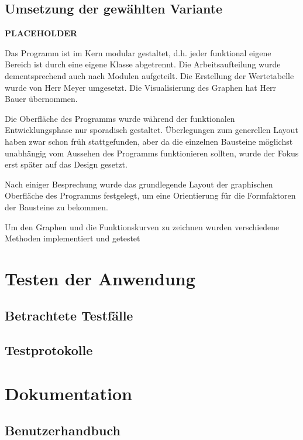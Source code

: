 \documentclass{article}
\begin{document}
\subsection{Umsetzung der gewählten Variante}

    \textbf{PLACEHOLDER}%

    Das Programm ist im Kern modular gestaltet, d.h. jeder funktional eigene Bereich ist durch eine eigene Klasse abgetrennt.
    Die Arbeitsaufteilung wurde dementsprechend auch nach Modulen aufgeteilt.
    Die Erstellung der Wertetabelle wurde von Herr Meyer umgesetzt.
    Die Visualisierung des Graphen hat Herr Bauer übernommen.

    Die Oberfläche des Programms wurde während der funktionalen Entwicklungsphase nur sporadisch gestaltet.
    Überlegungen zum generellen Layout haben zwar schon früh stattgefunden, aber da die einzelnen Bausteine möglichst unabhängig vom Aussehen des Programms funktionieren sollten, wurde der Fokus erst später auf das Design gesetzt.

    Nach einiger Besprechung wurde das grundlegende Layout der graphischen Oberfläche des Programms festgelegt, um eine Orientierung für die Formfaktoren der Bausteine zu bekommen.

    Um den Graphen und die Funktionskurven zu zeichnen wurden verschiedene Methoden implementiert und getestet

\newpage
\section{Testen der Anwendung}

\subsection{Betrachtete Testfälle}


\subsection{Testprotokolle}


\newpage
\section{Dokumentation}

\subsection{Benutzerhandbuch}
\end{document}
